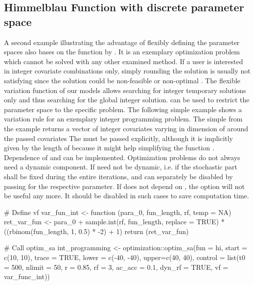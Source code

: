 \subsection{Himmelblau Function with discrete parameter space}
A second example illustrating the advantage of flexibly defining the parameter spaces also bases on the function by \citet{himmelblau_1972}. It is an exemplary optimization problem which cannot be solved with any other examined method. If a user is interested in integer covariate combinations only, simply rounding the solution is usually not satisfying since the solution could be non-feasible or non-optimal \citep{cardoso_1997}. The flexible variation function  of our models allows searching for integer temporary solutions only and thus searching for the global integer solution.  can be used to restrict the parameter space to the specific problem. The following simple example shows a variation rule for an exemplary integer programming problem. The simple  from the example returns a vector of integer covariates varying in dimension of  around the passed covariates  The  must be passed explicitly, although it is implicitly given by the length of  because it might help simplifying the function . Dependence of  and  can be implemented. Optimization problems do not always need a dynamic component. If  need not be dynamic, i.e. if the stochastic part shall be fixed during the entire iterations,  and  can separately be disabled by passing  for the respective parameter. If  does not depend on , the option  will not be useful any more. It should be disabled in such cases to save computation time.

\begin{example}
# Define vf
var_fun_int <- function (para_0, fun_length, rf, temp = NA) {
    ret_var_fun <- para_0 + sample.int(rf, fun_length, replace = TRUE) *
        ((rbinom(fun_length, 1, 0.5) * -2) + 1)
    return (ret_var_fun)
}

# Call optim_sa
int_programming <- optimization::optim_sa(fun = hi, start = c(10, 10), trace = TRUE, 
                                          lower = c(-40, -40), upper=c(40, 40),
                                          control = list(t0 = 500, nlimit = 50,
                                          r = 0.85, rf = 3, ac_acc = 0.1, 
                                          dyn_rf = TRUE, vf = var_func_int))
\end{example}

